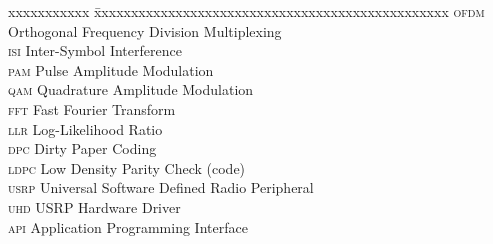 \abbreviations

\noindent
\begin{tabbing}
	xxxxxxxxxxx \= xxxxxxxxxxxxxxxxxxxxxxxxxxxxxxxxxxxxxxxxxxxxxxxx \kill
	\textsc{ofdm} \> Orthogonal Frequency Division Multiplexing \\
	\textsc{isi}  \> Inter-Symbol Interference \\
	\textsc{pam}  \> Pulse Amplitude Modulation \\
	\textsc{qam}  \> Quadrature Amplitude Modulation \\
	\textsc{fft}  \> Fast Fourier Transform \\
	\textsc{llr}  \> Log-Likelihood Ratio \\
	\textsc{dpc}  \> Dirty Paper Coding \\
	\textsc{ldpc} \> Low Density Parity Check (code) \\
	\textsc{usrp} \> Universal Software Defined Radio Peripheral \\
	\textsc{uhd}  \> USRP Hardware Driver \\
	\textsc{api}  \> Application Programming Interface \\
\end{tabbing}
